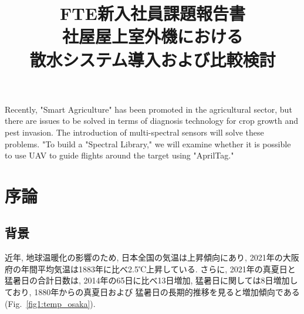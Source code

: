 \documentclass[a4j,fleqn,dvipdfmx,uplatex]{jsarticle}
\newcommand{\figref}[1]{Fig.\ \ref{#1}}
\begin{document}
%
\title{FTE新入社員課題報告書\\[2mm]社屋屋上室外機における\\散水システム導入および比較検討} %

\abst
{Recently, "Smart Agriculture" has been promoted in the agricultural sector, but there are issues to be solved in terms of diagnosis technology 
for crop growth and pest invasion. The introduction of multi-spectral sensors will solve these problems. 
"To build a "Spectral Library," we will examine whether it is possible to use UAV to guide flights around the target using "AprilTag."}

\maketitle
\section{序論}\label{sec1}
\subsection{背景}\label{background}
近年, 地球温暖化の影響のため, 日本全国の気温は上昇傾向にあり, 
2021年の大阪府の年間平均気温は1883年に比べ2.5℃上昇している\cite{temp_osaka}. 
さらに, 2021年の真夏日と猛暑日の合計日数は, 2014年の65日に比べ13日増加, 
猛暑日に関しては8日増加しており\cite{temp_osaka2}, 1880年からの真夏日および
猛暑日の長期的推移を見ると増加傾向である (\figref{fig1:temp_osaka}). 
\end{document}
